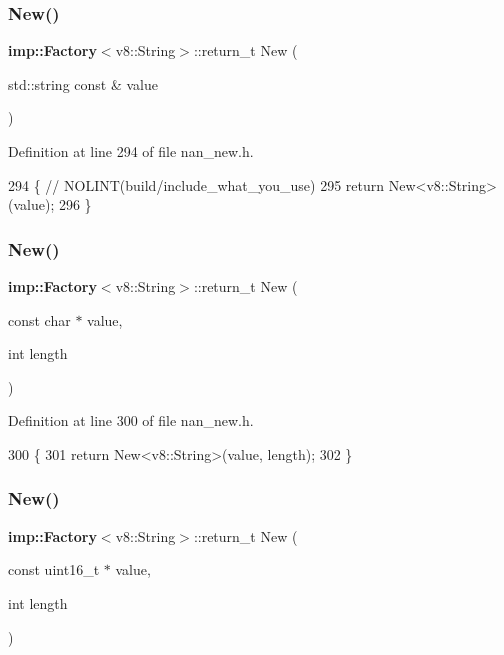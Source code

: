 \subsubsection{New()\hspace{0.1cm}{\footnotesize\ttfamily [15/22]}}
{\footnotesize\ttfamily \textbf{ imp\+::\+Factory}$<$v8\+::\+String$>$\+::return\+\_\+t New (\begin{DoxyParamCaption}\item[{std\+::string const \&}]{value }\end{DoxyParamCaption})}



Definition at line 294 of file nan\+\_\+new.\+h.


\begin{DoxyCode}
294                             \{  \textcolor{comment}{// NOLINT(build/include\_what\_you\_use)}
295   \textcolor{keywordflow}{return} New<v8::String>(value);
296 \}
\end{DoxyCode}
\mbox{\label{nan__new_8h_ac6b01ea3cf79c97b3224236b217bc72a}} 
\subsubsection{New()\hspace{0.1cm}{\footnotesize\ttfamily [16/22]}}
{\footnotesize\ttfamily \textbf{ imp\+::\+Factory}$<$v8\+::\+String$>$\+::return\+\_\+t New (\begin{DoxyParamCaption}\item[{const char $\ast$}]{value,  }\item[{int}]{length }\end{DoxyParamCaption})}



Definition at line 300 of file nan\+\_\+new.\+h.


\begin{DoxyCode}
300                                     \{
301   \textcolor{keywordflow}{return} New<v8::String>(value, length);
302 \}
\end{DoxyCode}
\mbox{\label{nan__new_8h_a70890f606c9dec0a18e395d131738123}} 
\subsubsection{New()\hspace{0.1cm}{\footnotesize\ttfamily [17/22]}}
{\footnotesize\ttfamily \textbf{ imp\+::\+Factory}$<$v8\+::\+String$>$\+::return\+\_\+t New (\begin{DoxyParamCaption}\item[{const uint16\+\_\+t $\ast$}]{value,  }\item[{int}]{length }\end{DoxyParamCaption})}



